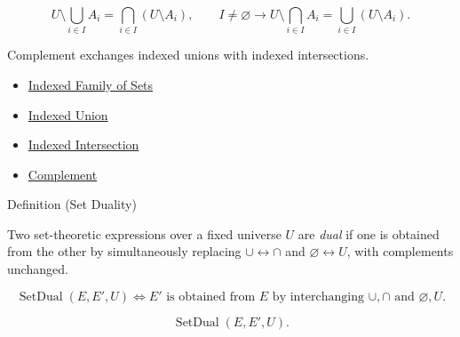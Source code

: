 \begin{remark*}
\[
  U\setminus\bigcup_{i\in I}A_i
  =
  \bigcap_{i\in I}(U\setminus A_i),
  \qquad
  I\neq\varnothing\to
  U\setminus\bigcap_{i\in I}A_i
  =
  \bigcup_{i\in I}(U\setminus A_i).
\]
\end{remark*}

\begin{remark*}[Interpretation]
Complement exchanges indexed unions with indexed intersections.
\end{remark*}


\begin{dependencies}
\begin{itemize}
  \item \hyperref[def:indexed-family]{Indexed Family of Sets}
  \item \hyperref[def:indexed-union]{Indexed Union}
  \item \hyperref[def:indexed-intersection]{Indexed Intersection}
  \item \hyperref[def:complement]{Complement}
\end{itemize}
\end{dependencies}

\begin{definitionbox}{Definition (Set Duality)}
\begin{definition}\label{def:set-duality}
Two set-theoretic expressions over a fixed universe $U$ are \emph{dual} if one
is obtained from the other by simultaneously replacing
$\cup \leftrightarrow \cap$ and $\varnothing \leftrightarrow U$, with
complements unchanged.
\end{definition}
\end{definitionbox}

\begin{remark*}
\[
  \operatorname{SetDual}(E,E',U)
  \iff
  E'\text{ is obtained from }E\text{ by interchanging }\cup,\cap
  \text{ and }\varnothing,U.
\]
\end{remark*}

\begin{remark*}
\[
  \operatorname{SetDual}(E,E',U).
\]
\end{remark*}

